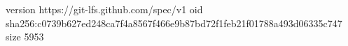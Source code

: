 version https://git-lfs.github.com/spec/v1
oid sha256:c0739b627ed248ca7f4a8567f466e9b87bd72f1feb21f01788a493d06335c747
size 5953
